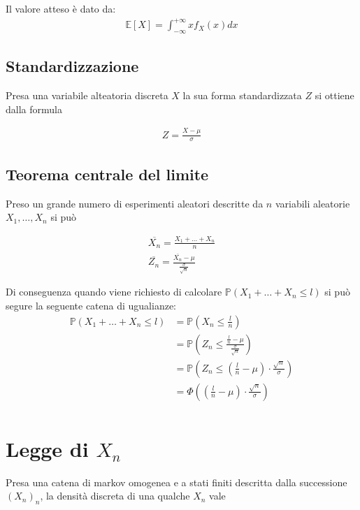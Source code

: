 \documentclass{article}
\begin{document}
Il valore atteso \`e dato da:
\begin{align*}
\mathbb{E}[X] = \int_{-\infty}^{+\infty} x f_X(x) dx
\end{align*}

\subsection{Standardizzazione}

Presa una variabile alteatoria discreta $X$ la sua forma standardizzata $Z$ si ottiene dalla formula

\begin{align*}
Z = \frac{X-\mu}{\sigma}
\end{align*}

\subsection{Teorema centrale del limite}

Preso un grande numero di esperimenti aleatori descritte da $n$ variabili aleatorie $X_1, \ldots, X_n$ si pu\`o

\begin{align*}
\overline{X_n} = \frac{X_1 + \ldots + X_n}{n} \\
\overline{Z_n} = \frac{\overline{X_n} - \mu}{\frac{\sigma}{\sqrt{n}}}
\end{align*}

Di conseguenza quando viene richiesto di calcolare $\mathbb{P}(X_1 + \ldots + X_n \leq l)$ si pu\`o segure la seguente catena di ugualianze:
\begin{align*}
\mathbb{P}(X_1 + \ldots + X_n \leq l) &= \mathbb{P}(X_n \leq \frac{l}{n})\\
&= \mathbb{P}(Z_n \leq \frac{\frac{l}{n} - \mu}{\frac{\sigma}{\sqrt{n}}}) \\
&= \mathbb{P}(Z_n \leq (\frac{l}{n} - \mu) \cdot \frac{\sqrt{n}}{\sigma}) \\
&= \Phi((\frac{l}{n} - \mu) \cdot \frac{\sqrt{n}}{\sigma}) \\
\end{align*}

\section{Legge di $X_n$}

Presa una catena di markov omogenea e a stati finiti descritta dalla successione $(X_n)_n$, la densit\`a discreta di una qualche $X_n$ vale
\end{document}
